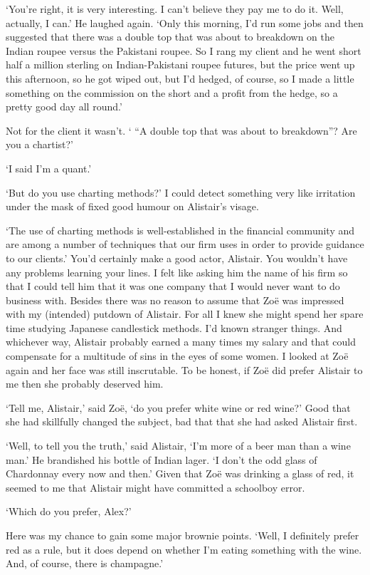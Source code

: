 `You're right, it is very interesting. I can't believe they pay me
to do it. Well, actually, I can.' He laughed again. `Only this
morning, I'd run some jobs and then suggested that there was a
double top that was about to breakdown on the Indian roupee versus
the Pakistani roupee. So I rang my client and he went short half a
million sterling on Indian-Pakistani roupee futures, but the price
went up this afternoon, so he got wiped out, but I'd hedged, of
course, so I made a little something on the commission on the short
{\twelveit and} a profit from the hedge, so a pretty good day all
round.'

Not for the client it wasn't. ` ``A double top that was about to
breakdown''? Are you a chartist?'

`I said I'm a quant.'

`But do you use charting methods?' I could detect something very
like irritation under the mask of fixed good humour on Alistair's
visage.

`The use of charting methods is well-established in the financial
community and are among a number of techniques that our firm uses in
order to provide guidance to our clients.' You'd certainly make a
good actor, Alistair. You wouldn't have any problems learning your
lines. I felt like asking him the name of his firm so that I could
tell him that it was one company that I would never want to do
business with. Besides there was no reason to assume that Zoë
was impressed with my (intended) putdown of Alistair. For all I knew
she might spend her spare time studying Japanese candlestick
methods. I'd known stranger things. And whichever way, Alistair
probably earned a many times my salary and that could compensate for
a multitude of sins in the eyes of some women. I looked at Zoë
again and her face was still inscrutable. To be honest, if Zoë
did prefer Alistair to me then she probably deserved him.

`Tell me, Alistair,' said Zoë, `do you prefer white wine or red
wine?' Good that she had skillfully changed the subject, bad that
that she had asked Alistair first.

`Well, to tell you the truth,' said Alistair, `I'm more of a beer
man than a wine man.' He brandished his bottle of Indian lager. `I
don't the odd glass of Chardonnay every now and then.' Given that
Zoë was drinking a glass of red, it seemed to me that Alistair
might have committed a schoolboy error.

`Which do you prefer, Alex?'

Here was my chance to gain some major brownie points. `Well, I
definitely prefer red as a rule, but it does depend on whether I'm
eating something with the wine. And, of course, there is champagne.'

